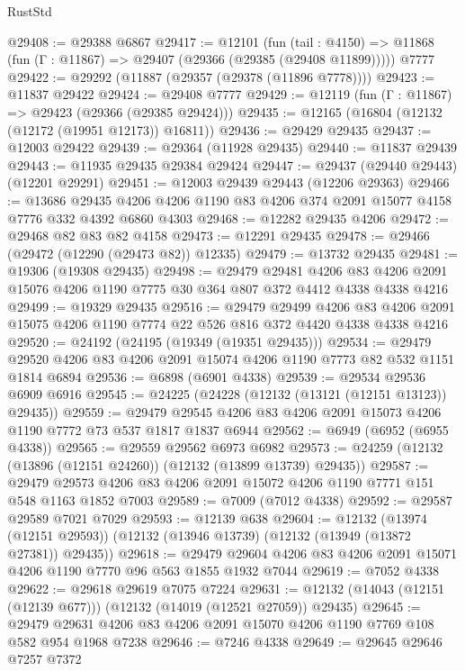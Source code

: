 \begin{lexlean}{RustStd}
\begin{coremodule}
@29408 := @29388 @6867
@29417 := @12101
    (fun (tail : @4150) => @11868 (fun (Γ : @11867) => @29407 (@29366 (@29385 (@29408 @11899)))))
    @7777
@29422 := @29292 (@11887 (@29357 (@29378 (@11896 @7778))))
@29423 := @11837 @29422
@29424 := @29408 @7777
@29429 := @12119 (fun (Γ : @11867) => @29423 (@29366 (@29385 @29424)))
@29435 := @12165 (@16804 (@12132 (@12172 (@19951 @12173)) @16811))
@29436 := @29429 @29435
@29437 := @12003 @29422
@29439 := @29364 (@11928 @29435)
@29440 := @11837 @29439
@29443 := @11935 @29435 @29384 @29424
@29447 := @29437 (@29440 @29443) (@12201 @29291)
@29451 := @12003 @29439 @29443 (@12206 @29363)
@29466 := @13686
    @29435
    @4206
    @4206
    @1190
    @83
    @4206
    @374
    @2091
    @15077
    @4158
    @7776
    @332
    @4392
    @6860
    @4303
@29468 := @12282 @29435 @4206
@29472 := @29468 @82 @83 @82 @4158
@29473 := @12291 @29435
@29478 := @29466 (@29472 (@12290 (@29473 @82)) @12335)
@29479 := @13732 @29435
@29481 := @19306 (@19308 @29435)
@29498 := @29479
    @29481
    @4206
    @83
    @4206
    @2091
    @15076
    @4206
    @1190
    @7775
    @30
    @364
    @807
    @372
    @4412
    @4338
    @4338
    @4216
@29499 := @19329 @29435
@29516 := @29479
    @29499
    @4206
    @83
    @4206
    @2091
    @15075
    @4206
    @1190
    @7774
    @22
    @526
    @816
    @372
    @4420
    @4338
    @4338
    @4216
@29520 := @24192 (@24195 (@19349 (@19351 @29435)))
@29534 := @29479 @29520 @4206 @83 @4206 @2091 @15074 @4206 @1190 @7773 @82 @532 @1151 @1814 @6894
@29536 := @6898 (@6901 @4338)
@29539 := @29534 @29536 @6909 @6916
@29545 := @24225 (@24228 (@12132 (@13121 (@12151 @13123)) @29435))
@29559 := @29479 @29545 @4206 @83 @4206 @2091 @15073 @4206 @1190 @7772 @73 @537 @1817 @1837 @6944
@29562 := @6949 (@6952 (@6955 @4338))
@29565 := @29559 @29562 @6973 @6982
@29573 := @24259 (@12132 (@13896 (@12151 @24260)) (@12132 (@13899 @13739) @29435))
@29587 := @29479 @29573 @4206 @83 @4206 @2091 @15072 @4206 @1190 @7771 @151 @548 @1163 @1852 @7003
@29589 := @7009 (@7012 @4338)
@29592 := @29587 @29589 @7021 @7029
@29593 := @12139 @638
@29604 := @12132
    (@13974 (@12151 @29593))
    (@12132 (@13946 @13739) (@12132 (@13949 (@13872 @27381)) @29435))
@29618 := @29479 @29604 @4206 @83 @4206 @2091 @15071 @4206 @1190 @7770 @96 @563 @1855 @1932 @7044
@29619 := @7052 @4338
@29622 := @29618 @29619 @7075 @7224
@29631 := @12132 (@14043 (@12151 (@12139 @677))) (@12132 (@14019 (@12521 @27059)) @29435)
@29645 := @29479 @29631 @4206 @83 @4206 @2091 @15070 @4206 @1190 @7769 @108 @582 @954 @1968 @7238
@29646 := @7246 @4338
@29649 := @29645 @29646 @7257 @7372

\end{coremodule}
\end{lexlean}
